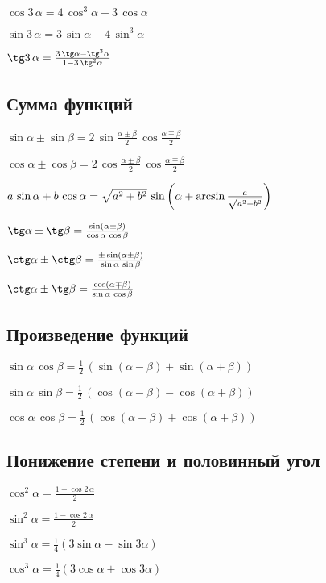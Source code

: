 $ \cos 3\, \alpha = 4\, \cos^3 \alpha - 3\, \cos \alpha $

$ \sin 3\, \alpha = 3\, \sin \alpha - 4\, \sin^3 \alpha $

$ \tg 3\, \alpha = \frac{3\, \tg \alpha - \tg^3 \alpha}{1 - 3\, \tg^2 \alpha} $

\subsection{Сумма функций}

$ \sin \alpha \pm \sin \beta = 2\, \sin \frac{\alpha \pm \beta}{2}\, \cos \frac{\alpha \mp \beta}{2} $

$ \cos \alpha \pm \cos \beta = 2\, \cos \frac{\alpha \pm \beta}{2}\, \cos \frac{\alpha \mp \beta}{2} $

$ a\, \sin \alpha + b\, \cos \alpha = \sqrt{\mathstrut a^2 + b^2}\, \sin \left(\alpha + \arcsin \frac{a}{\sqrt{\mathstrut a^2 + b^2}}\right) $

$ \tg \alpha \pm \tg \beta = \frac{\sin (\alpha \pm \beta)}{\cos \alpha\, \cos \beta} $

$ \ctg \alpha \pm \ctg \beta = \frac{\pm\sin (\alpha \pm \beta)}{\sin \alpha\, \sin \beta} $

$ \ctg \alpha \pm \tg \beta = \frac{\cos (\alpha \mp \beta)}{\sin \alpha\, \cos \beta} $

\subsection{Произведение функций}

$ \sin \alpha\, \cos \beta = \frac{1}{2}\, (\sin (\alpha - \beta) + \sin (\alpha + \beta)) $

$ \sin \alpha\, \sin \beta = \frac{1}{2}\, (\cos (\alpha - \beta) - \cos (\alpha + \beta)) $

$ \cos \alpha\, \cos \beta = \frac{1}{2}\, (\cos (\alpha - \beta) + \cos (\alpha + \beta)) $

\subsection{Понижение степени и половинный угол}

$ \cos^2 \alpha = \frac{1 + \cos 2\, \alpha}{2} $

$ \sin^2 \alpha = \frac{1 - \cos 2\, \alpha}{2} $

$ \sin^3 \alpha = \frac14(3\sin \alpha - \sin 3 \alpha) $

$ \cos^3 \alpha = \frac14(3\cos \alpha + \cos 3 \alpha) $

